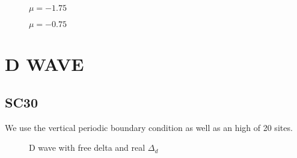 \documentclass[../main.tex]{subfiles}
\begin{document}
\begin{figure}[H]
    
    \caption{$\mu = -1.75$}
\end{figure}
\begin{figure}[H]
    
    \caption{$\mu = -0.75$}
\end{figure}

\section{D WAVE}

\subsection{SC30}
We use the vertical periodic boundary condition as well as an high of 20 sites.
\begin{figure}[H]
    
    \caption{D wave with free delta and real $\Delta_d$}
\end{figure}
\end{document}
